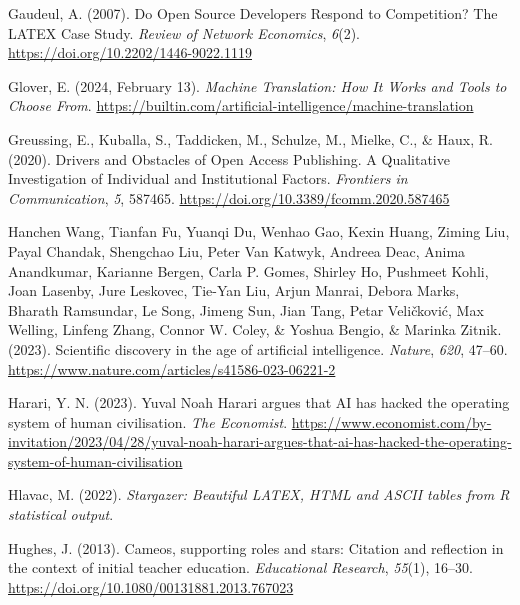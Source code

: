\documentclass[
  letterpaper,
  DIV=11,
  numbers=noendperiod]{scrreprt}
\newlength{\cslhangindent}
\newlength{\cslentryspacingunit} %
\newenvironment{CSLReferences}[2] %
 {%
  \setlength{\parindent}{0pt}
  \ifodd #1
  \let\oldpar\par
  \def\par{\hangindent=\cslhangindent\oldpar}
  \fi
  \setlength{\parskip}{#2\cslentryspacingunit}
 }%
 {}
\begin{document}
\begin{CSLReferences}{1}{0}
\leavevmode{}%
Gaudeul, A. (2007). Do {Open Source Developers Respond} to
{Competition}? {The LATEX Case Study}. \emph{Review of Network
Economics}, \emph{6}(2). \url{https://doi.org/10.2202/1446-9022.1119}

\leavevmode{}%
Glover, E. (2024, February 13). \emph{Machine {Translation}: {How It
Works} and {Tools} to {Choose From}}.
\url{https://builtin.com/artificial-intelligence/machine-translation}

\leavevmode{}%
Greussing, E., Kuballa, S., Taddicken, M., Schulze, M., Mielke, C., \&
Haux, R. (2020). Drivers and {Obstacles} of {Open Access Publishing}. {A
Qualitative Investigation} of {Individual} and {Institutional Factors}.
\emph{Frontiers in Communication}, \emph{5}, 587465.
\url{https://doi.org/10.3389/fcomm.2020.587465}

\leavevmode{}%
Hanchen Wang, Tianfan Fu, Yuanqi Du, Wenhao Gao, Kexin Huang, Ziming
Liu, Payal Chandak, Shengchao Liu, Peter Van Katwyk, Andreea Deac, Anima
Anandkumar, Karianne Bergen, Carla P. Gomes, Shirley Ho, Pushmeet Kohli,
Joan Lasenby, Jure Leskovec, Tie-Yan Liu, Arjun Manrai, Debora Marks,
Bharath Ramsundar, Le Song, Jimeng Sun, Jian Tang, Petar Veličković, Max
Welling, Linfeng Zhang, Connor W. Coley, \& Yoshua Bengio, \& Marinka
Zitnik. (2023). Scientific discovery in the age of artificial
intelligence. \emph{Nature}, \emph{620}, 47--60.
\url{https://www.nature.com/articles/s41586-023-06221-2}

\leavevmode{}%
Harari, Y. N. (2023). Yuval {Noah Harari} argues that {AI} has hacked
the operating system of human civilisation. \emph{The Economist}.
\url{https://www.economist.com/by-invitation/2023/04/28/yuval-noah-harari-argues-that-ai-has-hacked-the-operating-system-of-human-civilisation}

\leavevmode{}%
Hlavac, M. (2022). \emph{Stargazer: Beautiful {LATEX}, {HTML} and
{ASCII} tables from {R} statistical output}.

\leavevmode{}%
Hughes, J. (2013). Cameos, supporting roles and stars: Citation and
reflection in the context of initial teacher education.
\emph{Educational Research}, \emph{55}(1), 16--30.
\url{https://doi.org/10.1080/00131881.2013.767023}


\end{CSLReferences}
\end{document}
